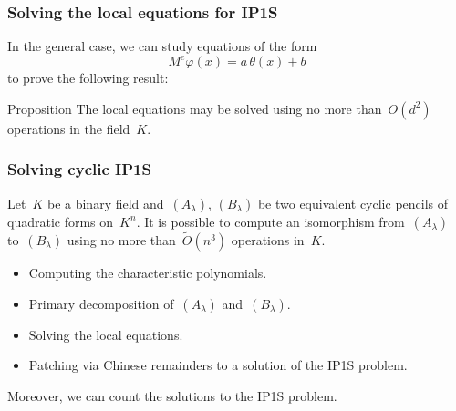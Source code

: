 \documentclass{beamer}%
\begin{document}
\begin{frame}\frametitle{Solving the local equations for IP1S}%
In the general case, we can study equations of the form
\begin{equation*}
M^{e} φ(x) = a\, θ(x) + b
\end{equation*}
to prove the following result:
\begin{block}{Proposition}
The local equations may be solved using no more than~$O(d^2)$
operations in the field~$K$.
\end{block}

\end{frame}%
\begin{frame}\frametitle{Solving cyclic IP1S}%
\begin{theorem}
Let~$K$ be a binary field and~$(A_{λ})$, $(B_{λ})$ be two equivalent
cyclic pencils of quadratic forms on~$K^n$. It is possible to compute an
isomorphism from~$(A_{λ})$ to~$(B_{λ})$ using no more than~$\widetilde
O(n^3)$ operations in~$K$.
\end{theorem}
\begin{itemize}
\item Computing the characteristic polynomials.
\item Primary decomposition of~$(A_{λ})$ and~$(B_{λ})$.
\item Solving the local equations.
\item Patching via Chinese remainders to a solution of the IP1S problem.
\end{itemize}
Moreover, we can count the solutions to the IP1S problem.
\end{frame}%
\end{document}
